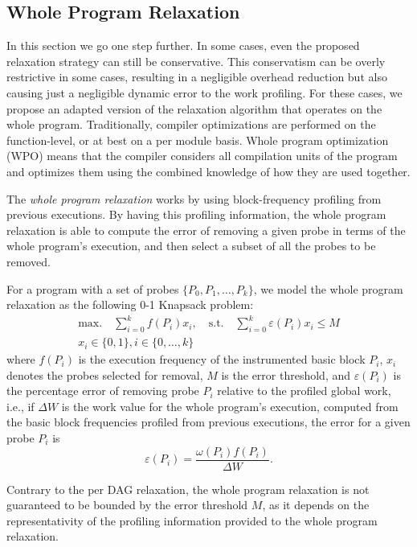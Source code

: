 \subsection{Whole Program Relaxation}

In this section we go one step further. In some cases, even the proposed relaxation strategy can still be conservative. This conservatism
can be overly restrictive in some cases, resulting in a negligible overhead reduction but also causing just a negligible dynamic error to
the work profiling. For these cases, we propose an adapted version of the relaxation algorithm that operates on the whole program.
Traditionally, compiler optimizations are performed on the function-level, or at best on a per module basis. Whole program optimization
(WPO) means that the compiler considers all compilation units of the program and optimizes them using the combined knowledge of how they
are used together.

The \textit{whole program relaxation} works by using block-frequency profiling
from previous executions.
By having this profiling information, the whole program relaxation is able to
compute the error of removing a given probe in terms of the whole program's execution,
and then select a subset of all the probes to be removed.

For a program with a set of probes $\{P_0, P_1, \ldots, P_k\}$, we model the
whole program relaxation as the following 0-1 Knapsack problem:
\begin{gather*}
\textrm{max.}\quad\sum_{i=0}^{k} f(P_i)x_i,\quad
\textrm{s.t.}\quad\sum_{i=0}^{k} \varepsilon(P_i)x_i \leq M \\
x_i\in\{0,1\}, i\in\{0,\ldots,k\}
\end{gather*}
where $f(P_i)$ is the execution frequency of the instrumented basic block $P_i$,
$x_i$ denotes the probes selected for removal, $M$ is the error threshold, and
$\varepsilon(P_i)$ is the percentage error of removing probe $P_i$ relative to
the profiled global work, i.e.,
if $\Delta W$ is the work value for the whole program's execution, computed from
the basic block frequencies profiled from previous executions, the error for a
given probe $P_i$ is
\[
\varepsilon(P_i) = \frac{\omega(P_i)f(P_i)}{\Delta W}.
\]

Contrary to the per DAG relaxation, the whole program relaxation is not
guaranteed to be bounded by the error threshold $M$,
as it depends on the representativity %
of the profiling information provided to the whole program relaxation.
